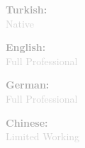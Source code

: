 \documentclass[10pt,a4paper]{article}
\begin{document}
\vspace{1pt}
\noindent
\begin{minipage}[t]{0.24\textwidth}
  \textcolor{darkgray}{\textbf{Turkish:}} \\
  \textcolor{lightgray}{\small Native}
\end{minipage}%
\hfill
\begin{minipage}[t]{0.24\textwidth}
  \textcolor{darkgray}{\textbf{English:}} \\
  \textcolor{lightgray}{\small Full Professional}
\end{minipage}%
\hfill
\begin{minipage}[t]{0.24\textwidth}
  \textcolor{darkgray}{\textbf{German:}} \\
  \textcolor{lightgray}{\small Full Professional}
\end{minipage}%
\hfill
\begin{minipage}[t]{0.24\textwidth}
  \textcolor{darkgray}{\textbf{Chinese:}} \\
  \textcolor{lightgray}{\small Limited Working}
\end{minipage}
\end{document}
